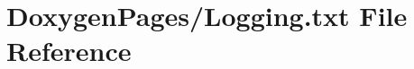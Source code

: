 \hypertarget{_logging_8txt}{\section{Doxygen\-Pages/\-Logging.txt File Reference}
\label{_logging_8txt}
}
